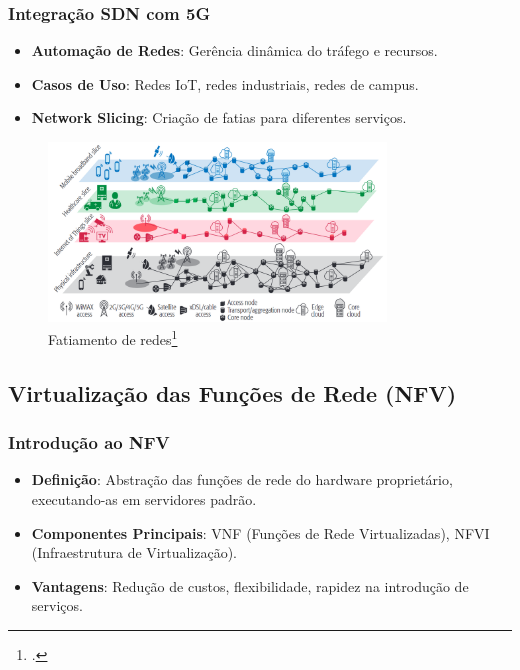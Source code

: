 \begin{frame}
    \frametitle{Integração SDN com 5G}
    \begin{itemize}
        \item \textbf{Automação de Redes}: Gerência dinâmica do tráfego e recursos.
        \item \textbf{Casos de Uso}: Redes IoT, redes industriais, redes de campus.
        \item \textbf{Network Slicing}: Criação de fatias para diferentes serviços.
    \end{itemize}
    \begin{figure}[h]
        \centering
        \includegraphics[width=0.8\textwidth]{figs/Network_Slicing.png}
        \caption{Fatiamento de redes\footcite{Network_Slicing}}
    \end{figure}
\end{frame}

\subsection{Virtualização das Funções de Rede (NFV)}
\begin{frame}
    \frametitle{Introdução ao NFV}
    \begin{itemize}
        \item \textbf{Definição}: Abstração das funções de rede do hardware proprietário, executando-as em servidores padrão.
        \item \textbf{Componentes Principais}: VNF (Funções de Rede Virtualizadas), NFVI (Infraestrutura de Virtualização).
        \item \textbf{Vantagens}: Redução de custos, flexibilidade, rapidez na introdução de serviços.
    \end{itemize}
\end{frame}

